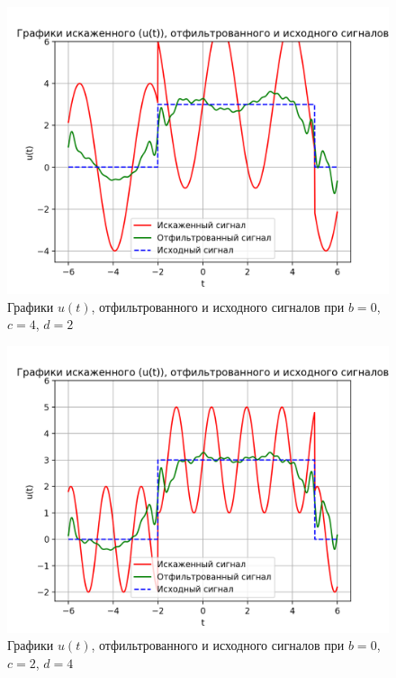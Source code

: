 \begin{figure}[ht!]
    \centering
    \includegraphics[scale=0.75]{media/1 task/specific_freq/Cleaned_0_4_2_-1,0_-0,22_-2,99_-2,7.png}
    \caption{Графики  $u(t)$, отфильтрованного и исходного сигналов при $b=0$,  $c=4$,  $d=2$}
    \label{fig:cleaned_0_4_2}
\end{figure}

\clearpage

\begin{figure}[ht!]
    \centering
    \includegraphics[scale=0.75]{media/1 task/specific_freq/Cleaned_0_2_4_-1,0_-0,22_-2,99_-2,7.png}
    \caption{Графики  $u(t)$, отфильтрованного и исходного сигналов при $b=0$,  $c=2$,  $d=4$}
    \label{fig:cleaned_0_2_4}
\end{figure}

